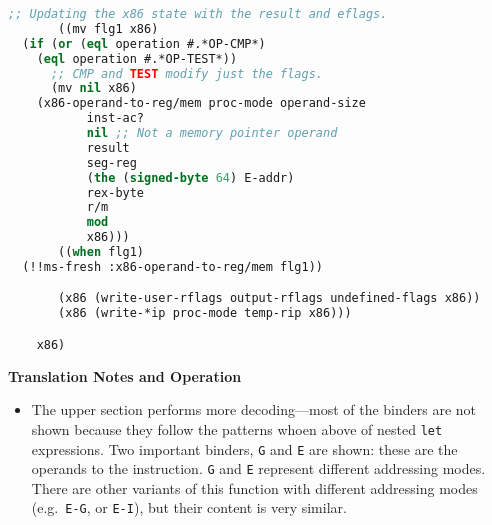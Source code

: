 \documentclass[a4paper]{article}
\begin{document}
\begin{tcolorbox}[breakable]
\begin{parcolumns}{2}
{\begin{lstlisting}[language=lisp]
       ;; Updating the x86 state with the result and eflags.
       ((mv flg1 x86)
  (if (or (eql operation #.*OP-CMP*)
    (eql operation #.*OP-TEST*))
      ;; CMP and TEST modify just the flags.
      (mv nil x86)
    (x86-operand-to-reg/mem proc-mode operand-size
           inst-ac?
           nil ;; Not a memory pointer operand
           result
           seg-reg
           (the (signed-byte 64) E-addr)
           rex-byte
           r/m
           mod
           x86)))
       ((when flg1)
  (!!ms-fresh :x86-operand-to-reg/mem flg1))

       (x86 (write-user-rflags output-rflags undefined-flags x86))
       (x86 (write-*ip proc-mode temp-rip x86)))

    x86)
\end{lstlisting}
}
\colplacechunks

\end{parcolumns}

\textbf{Translation Notes and Operation}

\begin{itemize}
  \item The upper section performs more decoding---most of the binders are not shown because they follow the patterns whoen above of nested \texttt{let} expressions.  Two important binders, \texttt{G} and \texttt{E} are shown: these are the operands to the instruction.  \texttt{G} and \texttt{E} represent different addressing modes.  There are other variants of this function with different addressing modes (e.g.~\texttt{E-G}, or \texttt{E-I}), but their content is very similar.


\end{itemize}
\end{tcolorbox}
\end{document}

